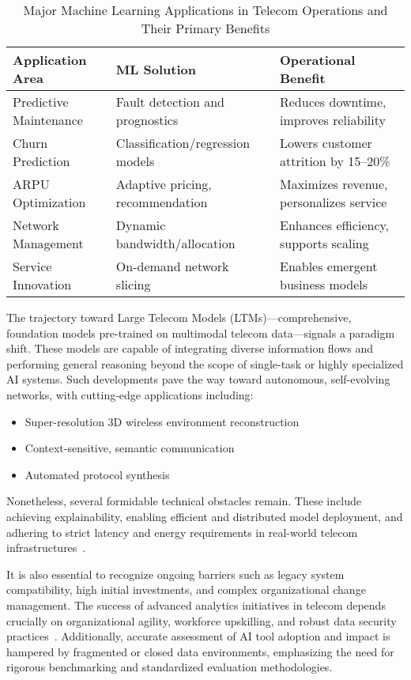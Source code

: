 \documentclass[11pt]{article}
\begin{document}
\begin{table}[ht]
    \centering
    \caption{Major Machine Learning Applications in Telecom Operations and Their Primary Benefits}
    \label{tab:ml_benefits_telecom}
    \begin{tabular}{|l|l|l|}
        \hline
        \textbf{Application Area} & \textbf{ML Solution} & \textbf{Operational Benefit} \\
        \hline
        Predictive Maintenance & Fault detection and prognostics & Reduces downtime, improves reliability \\
        Churn Prediction & Classification/regression models & Lowers customer attrition by 15--20\% \\
        ARPU Optimization & Adaptive pricing, recommendation & Maximizes revenue, personalizes service \\
        Network Management & Dynamic bandwidth/allocation & Enhances efficiency, supports scaling \\
        Service Innovation & On-demand network slicing & Enables emergent business models \\
        \hline
    \end{tabular}
\end{table}

The trajectory toward Large Telecom Models (LTMs)—comprehensive, foundation models pre-trained on multimodal telecom data—signals a paradigm shift. These models are capable of integrating diverse information flows and performing general reasoning beyond the scope of single-task or highly specialized AI systems. Such developments pave the way toward autonomous, self-evolving networks, with cutting-edge applications including:

\begin{itemize}
    \item Super-resolution 3D wireless environment reconstruction
    \item Context-sensitive, semantic communication
    \item Automated protocol synthesis
\end{itemize}

Nonetheless, several formidable technical obstacles remain. These include achieving explainability, enabling efficient and distributed model deployment, and adhering to strict latency and energy requirements in real-world telecom infrastructures~\cite{ref8, ref15}.

It is also essential to recognize ongoing barriers such as legacy system compatibility, high initial investments, and complex organizational change management. The success of advanced analytics initiatives in telecom depends crucially on organizational agility, workforce upskilling, and robust data security practices~\cite{ref19}. Additionally, accurate assessment of AI tool adoption and impact is hampered by fragmented or closed data environments, emphasizing the need for rigorous benchmarking and standardized evaluation methodologies.
\end{document}

